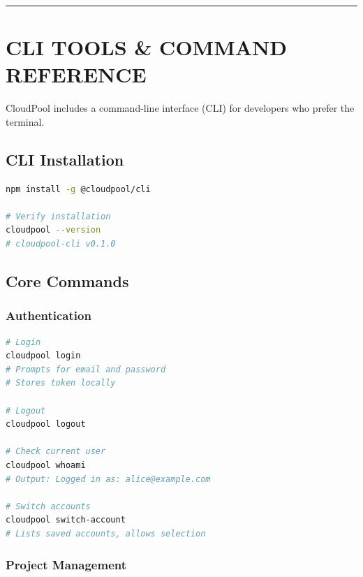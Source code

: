 \documentclass[11pt,a4paper]{report}
\begin{document}
\vfill\hrule\vfill



\part{CLI TOOLS \& COMMAND REFERENCE}


CloudPool includes a command-line interface (CLI) for developers who prefer the terminal.


\chapter{CLI Installation}


\begin{lstlisting}[language=bash]
npm install -g @cloudpool/cli

# Verify installation
cloudpool --version
# cloudpool-cli v0.1.0
\end{lstlisting}


\chapter{Core Commands}



\section{Authentication}


\begin{lstlisting}[language=bash]
# Login
cloudpool login
# Prompts for email and password
# Stores token locally

# Logout
cloudpool logout

# Check current user
cloudpool whoami
# Output: Logged in as: alice@example.com

# Switch accounts
cloudpool switch-account
# Lists saved accounts, allows selection
\end{lstlisting}


\section{Project Management}
\end{document}
